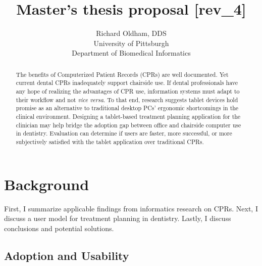 \documentclass[11pt]{article}
\begin{document}
\title{Master's thesis proposal [rev\_4]}
\author{\normalsize Richard Oldham, DDS \vspace{7pt} \\ 
		\small University of Pittsburgh \vspace{-2pt} \\
		\small Department of Biomedical Informatics}
\maketitle


\begin{abstract}
The benefits of Computerized Patient Records (CPRs) are well documented. Yet current dental CPRs inadequately support chairside use. If dental professionals have any hope of realizing the advantages of CPR use, information systems must adapt to their workflow and not \textit{vice versa}. To that end, research suggests tablet devices hold promise as an alternative to traditional desktop PCs' ergonomic shortcomings in the clinical environment. Designing a tablet-based treatment planning application for the clinician may help bridge the adoption gap between office and chairside computer use in dentistry. Evaluation can determine if users are faster, more successful, or more subjectively satisfied with the tablet application over traditional CPRs.
\end{abstract}

\section{Background}
First, I summarize applicable findings from informatics research on CPRs. Next, I discuss a user model for treatment planning in dentistry. Lastly, I discuss conclusions and potential solutions.

\subsection{Adoption and Usability}
\end{document}
